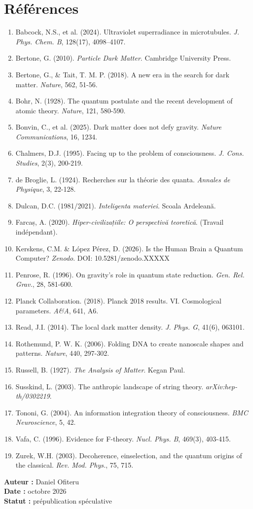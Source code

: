 \section*{Références}
\begin{enumerate}
    \item Babcock, N.S., et al. (2024). Ultraviolet superradiance in microtubules. \textit{J. Phys. Chem. B}, 128(17), 4098--4107.
    \item Bertone, G. (2010). \textit{Particle Dark Matter}. Cambridge University Press.
    \item Bertone, G., \& Tait, T. M. P. (2018). A new era in the search for dark matter. \textit{Nature}, 562, 51-56.
    \item Bohr, N. (1928). The quantum postulate and the recent development of atomic theory. \textit{Nature}, 121, 580-590.
    \item Bonvin, C., et al. (2025). Dark matter does not defy gravity. \textit{Nature Communications}, 16, 1234.
    \item Chalmers, D.J. (1995). Facing up to the problem of consciousness. \textit{J. Cons. Studies}, 2(3), 200-219.
    \item de Broglie, L. (1924). Recherches sur la théorie des quanta. \textit{Annales de Physique}, 3, 22-128.
    \item Dulcan, D.C. (1981/2021). \textit{Inteligenta materiei}. Scoala Ardeleană.
    \item Farcaș, A. (2020). \textit{Hiper-civilizațiile: O perspectivă teoretică}. (Travail indépendant).
    \item Kerskens, C.M. \& López Pérez, D. (2026). Is the Human Brain a Quantum Computer? \textit{Zenodo}. DOI: 10.5281/zenodo.XXXXX
    \item Penrose, R. (1996). On gravity's role in quantum state reduction. \textit{Gen. Rel. Grav.}, 28, 581-600.
    \item Planck Collaboration. (2018). Planck 2018 results. VI. Cosmological parameters. \textit{A\&A}, 641, A6.
    \item Read, J.I. (2014). The local dark matter density. \textit{J. Phys. G}, 41(6), 063101.
    \item Rothemund, P. W. K. (2006). Folding DNA to create nanoscale shapes and patterns. \textit{Nature}, 440, 297-302.
    \item Russell, B. (1927). \textit{The Analysis of Matter}. Kegan Paul.
    \item Susskind, L. (2003). The anthropic landscape of string theory. \textit{arXiv:hep-th/0302219}.
    \item Tononi, G. (2004). An information integration theory of consciousness. \textit{BMC Neuroscience}, 5, 42.
    \item Vafa, C. (1996). Evidence for F-theory. \textit{Nucl. Phys. B}, 469(3), 403-415.
    \item Zurek, W.H. (2003). Decoherence, einselection, and the quantum origins of the classical. \textit{Rev. Mod. Phys.}, 75, 715.
\end{enumerate}

\vspace{1cm}
\begin{flushright}
\textbf{Auteur :} Daniel Ofiteru \\
\textbf{Date :} octobre 2026 \\
\textbf{Statut :} prépublication spéculative
\end{flushright}


